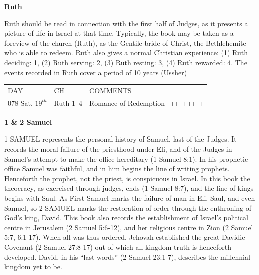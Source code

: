 \documentclass[10pt,landscape,twocolumn,letterpaper]{article}
\begin{document}
\begin{center}
\textbf{Ruth}
\end{center}
Ruth should be read in connection with the first half of Judges, as it presents a picture of life in Israel at that time.  
Typically, the book may be taken as a foreview of the church (Ruth), as the Gentile bride of Christ, the Bethlehemite who is able to redeem. Ruth also gives a normal Christian experience: (1) Ruth deciding: 1, (2) Ruth serving: 2, (3) Ruth resting: 3, (4) Ruth rewarded: 4. The events recorded in Ruth cover a period of 10 years (Ussher)
\begin{tabular}{p{0.7in}p{0.7in}p{1.8in}p{0.55in}}
  DAY & CH & COMMENTS &  \\
\tiny 078 \normalsize  \textcolor[rgb]{0.00,0.00,1.00}{Sat, $19^{th}$} & \textcolor[rgb]{0.00,0.00,1.00}{Ruth 1--4} & \textcolor[rgb]{0.50,0.50,0.50}{\small Romance of Redemption} & $\boxempty$ $\boxempty$ $\boxempty$ $\boxempty$\\
\end{tabular}
\begin{center}
\textbf{1 \& 2 Samuel}
\end{center}
1 SAMUEL represents the personal history of Samuel, last of the Judges. It records the moral failure of the priesthood under Eli, and of the Judges in Samuel's attempt to make the office hereditary (1 Samuel 8:1). In his prophetic office Samuel was faithful, and in him begins the line of writing prophets. Henceforth the prophet, not the priest, is conspicuous in Israel. In this book the theocracy, as exercised through judges, ends (1 Samuel 8:7), and the line of kings begins with Saul. As First Samuel marks the failure of man in Eli, Saul, and even Samuel, so 2 SAMUEL marks the restoration of order through the enthroning of God's king, David. This book also records the establishment of Israel's political centre in Jerusalem (2 Samuel 5:6-12), and her religious centre in Zion (2 Samuel 5:7, 6:1-17). When all was thus ordered, Jehovah established the great Davidic Covenant (2 Samuel 27:8-17) out of which all kingdom truth is henceforth developed. David, in his ``last words'' (2 Samuel 23:1-7), describes the millennial kingdom yet to be.
\end{document}
